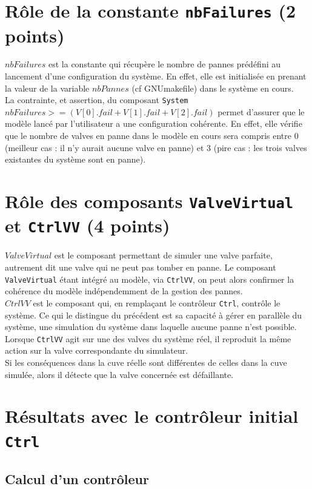 \documentclass[a4paper]{book}
\begin{document}
\section{Rôle de la constante {\tt nbFailures} (2 points)}

$nbFailures$ est la constante qui récupère le nombre de pannes prédéfini au lancement d'une configuration du système. En effet, elle est initialisée en prenant la valeur de la variable $nbPannes$ (cf GNUmakefile) dans le système en cours. \\
La contrainte, et assertion, du composant {\tt System} $nbFailures >= (V[0].fail + V[1].fail + V[2].fail)$ permet d'assurer que le modèle lancé par l'utilisateur a une configuration cohérente. En effet, elle vérifie que le nombre de valves en panne dans le modèle en cours sera compris entre 0 (meilleur cas : il n'y aurait aucune valve en panne) et 3 (pire cas : les trois valves existantes du système sont en panne). \\


\section{Rôle des composants {\tt ValveVirtual} et {\tt CtrlVV} (4 points)}

$ValveVirtual$ est le composant permettant de simuler une valve parfaite, autrement dit une valve qui ne peut pas tomber en panne. Le composant {\tt ValveVirtual} étant intégré au modèle, via {\tt CtrlVV}, on peut alors confirmer la cohérence du modèle indépendemment de la gestion des pannes. \\
$CtrlVV$ est le composant qui, en remplaçant le contrôleur {\tt Ctrl}, contrôle le système. Ce qui le distingue du précédent est sa capacité à gérer en parallèle du système, une simulation du système dans laquelle aucune panne n'est possible. \\
Lorsque {\tt CtrlVV} agit sur une des valves du système réel, il reproduit la même action sur la valve correspondante du simulateur. \\
Si les conséquences dans la cuve réelle sont différentes de celles dans la cuve simulée, alors il détecte que la valve concernée est défaillante.


\section{Résultats avec le contrôleur initial {\tt Ctrl}}

\subsection{Calcul d'un contrôleur}
\end{document}
